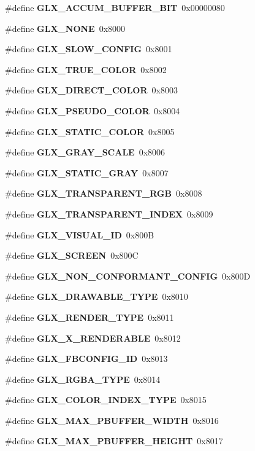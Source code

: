 \begin{DoxyCompactItemize}
\item 
\#define {\bf G\+L\+X\+\_\+\+A\+C\+C\+U\+M\+\_\+\+B\+U\+F\+F\+E\+R\+\_\+\+B\+IT}~0x00000080
\item 
\#define {\bf G\+L\+X\+\_\+\+N\+O\+NE}~0x8000
\item 
\#define {\bf G\+L\+X\+\_\+\+S\+L\+O\+W\+\_\+\+C\+O\+N\+F\+IG}~0x8001
\item 
\#define {\bf G\+L\+X\+\_\+\+T\+R\+U\+E\+\_\+\+C\+O\+L\+OR}~0x8002
\item 
\#define {\bf G\+L\+X\+\_\+\+D\+I\+R\+E\+C\+T\+\_\+\+C\+O\+L\+OR}~0x8003
\item 
\#define {\bf G\+L\+X\+\_\+\+P\+S\+E\+U\+D\+O\+\_\+\+C\+O\+L\+OR}~0x8004
\item 
\#define {\bf G\+L\+X\+\_\+\+S\+T\+A\+T\+I\+C\+\_\+\+C\+O\+L\+OR}~0x8005
\item 
\#define {\bf G\+L\+X\+\_\+\+G\+R\+A\+Y\+\_\+\+S\+C\+A\+LE}~0x8006
\item 
\#define {\bf G\+L\+X\+\_\+\+S\+T\+A\+T\+I\+C\+\_\+\+G\+R\+AY}~0x8007
\item 
\#define {\bf G\+L\+X\+\_\+\+T\+R\+A\+N\+S\+P\+A\+R\+E\+N\+T\+\_\+\+R\+GB}~0x8008
\item 
\#define {\bf G\+L\+X\+\_\+\+T\+R\+A\+N\+S\+P\+A\+R\+E\+N\+T\+\_\+\+I\+N\+D\+EX}~0x8009
\item 
\#define {\bf G\+L\+X\+\_\+\+V\+I\+S\+U\+A\+L\+\_\+\+ID}~0x800B
\item 
\#define {\bf G\+L\+X\+\_\+\+S\+C\+R\+E\+EN}~0x800C
\item 
\#define {\bf G\+L\+X\+\_\+\+N\+O\+N\+\_\+\+C\+O\+N\+F\+O\+R\+M\+A\+N\+T\+\_\+\+C\+O\+N\+F\+IG}~0x800D
\item 
\#define {\bf G\+L\+X\+\_\+\+D\+R\+A\+W\+A\+B\+L\+E\+\_\+\+T\+Y\+PE}~0x8010
\item 
\#define {\bf G\+L\+X\+\_\+\+R\+E\+N\+D\+E\+R\+\_\+\+T\+Y\+PE}~0x8011
\item 
\#define {\bf G\+L\+X\+\_\+\+X\+\_\+\+R\+E\+N\+D\+E\+R\+A\+B\+LE}~0x8012
\item 
\#define {\bf G\+L\+X\+\_\+\+F\+B\+C\+O\+N\+F\+I\+G\+\_\+\+ID}~0x8013
\item 
\#define {\bf G\+L\+X\+\_\+\+R\+G\+B\+A\+\_\+\+T\+Y\+PE}~0x8014
\item 
\#define {\bf G\+L\+X\+\_\+\+C\+O\+L\+O\+R\+\_\+\+I\+N\+D\+E\+X\+\_\+\+T\+Y\+PE}~0x8015
\item 
\#define {\bf G\+L\+X\+\_\+\+M\+A\+X\+\_\+\+P\+B\+U\+F\+F\+E\+R\+\_\+\+W\+I\+D\+TH}~0x8016
\item 
\#define {\bf G\+L\+X\+\_\+\+M\+A\+X\+\_\+\+P\+B\+U\+F\+F\+E\+R\+\_\+\+H\+E\+I\+G\+HT}~0x8017

\end{DoxyCompactItemize}
